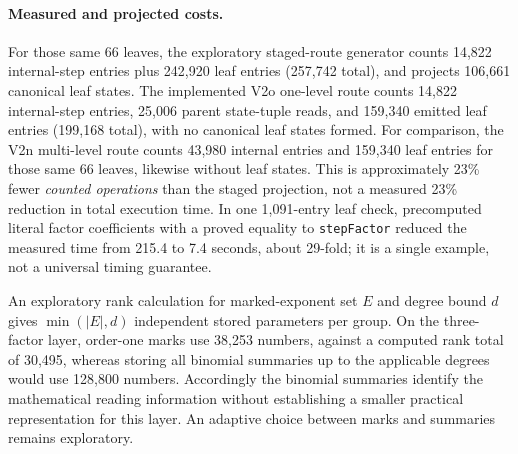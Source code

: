 \documentclass[11pt]{article}
\newcommand{\code}[1]{\texttt{#1}}
\begin{document}
\paragraph{Measured and projected costs.}
For those same 66 leaves, the exploratory staged-route generator counts
14,822 internal-step entries plus 242,920 leaf entries (257,742 total),
and projects 106,661 canonical leaf states. The implemented V2o one-level
route counts 14,822 internal-step entries, 25,006 parent state-tuple reads,
and 159,340 emitted leaf entries (199,168 total), with no canonical leaf
states formed. For comparison, the V2n multi-level route counts 43,980 internal entries
and 159,340 leaf entries for those same 66 leaves, likewise without leaf states.
This is approximately 23\% fewer \emph{counted operations}
than the staged projection, not a measured 23\% reduction in total
execution time. In one 1,091-entry leaf check, precomputed literal
factor coefficients with a proved equality to \code{stepFactor} reduced
the measured time from 215.4 to 7.4 seconds, about 29-fold; it is a
single example, not a universal timing guarantee.

An exploratory rank calculation for marked-exponent set $E$ and degree
bound $d$ gives $\min(|E|,d)$ independent stored parameters per group.
On the three-factor layer, order-one marks use 38,253 numbers, against
a computed rank total of 30,495, whereas storing all binomial summaries
up to the applicable degrees would use 128,800 numbers. Accordingly the
binomial summaries identify the mathematical reading information without
establishing a smaller practical representation for this layer. An
adaptive choice between marks and summaries remains exploratory.
\end{document}

